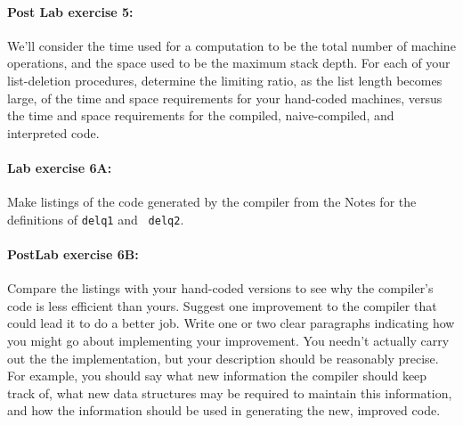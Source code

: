 \paragraph{Post Lab exercise 5:} We'll consider the time used for a
computation to be the total number of machine operations, and the space
used to be the maximum stack depth.  For each of your list-deletion
procedures, determine the limiting ratio, as the list length becomes
large, of the time and space requirements for your hand-coded machines,
versus the time and space requirements for the compiled, naive-compiled,
and interpreted code.


\paragraph{Lab exercise 6A:} Make listings of the code generated by the
compiler from the Notes for the definitions of {\tt delq1} and {\tt
delq2}.

\paragraph{PostLab exercise 6B:}
Compare the listings with your hand-coded versions to see why the
compiler's code is less efficient than yours.  Suggest one improvement to
the compiler that could lead it to do a better job.  Write one or two
clear paragraphs indicating how you might go about implementing your
improvement.  You needn't actually carry out the the implementation, but
your description should be reasonably precise.  For example, you should
say what new information the compiler should keep track of, what new data
structures may be required to maintain this information, and how the
information should be used in generating the new, improved code.



